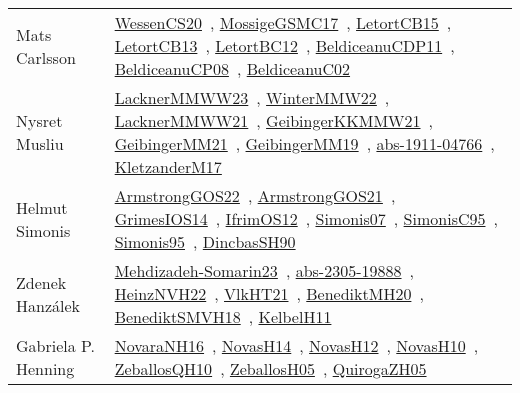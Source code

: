 {\begin{longtable}{p{4cm}p{20cm}}
Mats Carlsson & \href{papers/WessenCS20.pdf}{WessenCS20}~\cite{WessenCS20}, \href{papers/MossigeGSMC17.pdf}{MossigeGSMC17}~\cite{MossigeGSMC17}, \href{articles/LetortCB15.pdf}{LetortCB15}~\cite{LetortCB15}, \href{papers/LetortCB13.pdf}{LetortCB13}~\cite{LetortCB13}, \href{papers/LetortBC12.pdf}{LetortBC12}~\cite{LetortBC12}, \href{articles/BeldiceanuCDP11.pdf}{BeldiceanuCDP11}~\cite{BeldiceanuCDP11}, \href{papers/BeldiceanuCP08.pdf}{BeldiceanuCP08}~\cite{BeldiceanuCP08}, \href{papers/BeldiceanuC02.pdf}{BeldiceanuC02}~\cite{BeldiceanuC02}\\
Nysret Musliu & \href{articles/LacknerMMWW23.pdf}{LacknerMMWW23}~\cite{LacknerMMWW23}, \href{papers/WinterMMW22.pdf}{WinterMMW22}~\cite{WinterMMW22}, \href{papers/LacknerMMWW21.pdf}{LacknerMMWW21}~\cite{LacknerMMWW21}, \href{papers/GeibingerKKMMW21.pdf}{GeibingerKKMMW21}~\cite{GeibingerKKMMW21}, \href{papers/GeibingerMM21.pdf}{GeibingerMM21}~\cite{GeibingerMM21}, \href{papers/GeibingerMM19.pdf}{GeibingerMM19}~\cite{GeibingerMM19}, \href{articles/abs-1911-04766.pdf}{abs-1911-04766}~\cite{abs-1911-04766}, \href{papers/KletzanderM17.pdf}{KletzanderM17}~\cite{KletzanderM17}\\
Helmut Simonis & \href{papers/ArmstrongGOS22.pdf}{ArmstrongGOS22}~\cite{ArmstrongGOS22}, \href{papers/ArmstrongGOS21.pdf}{ArmstrongGOS21}~\cite{ArmstrongGOS21}, \href{articles/GrimesIOS14.pdf}{GrimesIOS14}~\cite{GrimesIOS14}, \href{papers/IfrimOS12.pdf}{IfrimOS12}~\cite{IfrimOS12}, \href{articles/Simonis07.pdf}{Simonis07}~\cite{Simonis07}, \href{papers/SimonisC95.pdf}{SimonisC95}~\cite{SimonisC95}, \href{papers/Simonis95.pdf}{Simonis95}~\cite{Simonis95}, \href{articles/DincbasSH90.pdf}{DincbasSH90}~\cite{DincbasSH90}\\
Zdenek Hanz{\'{a}}lek & \href{papers/Mehdizadeh-Somarin23.pdf}{Mehdizadeh-Somarin23}~\cite{Mehdizadeh-Somarin23}, \href{articles/abs-2305-19888.pdf}{abs-2305-19888}~\cite{abs-2305-19888}, \href{articles/HeinzNVH22.pdf}{HeinzNVH22}~\cite{HeinzNVH22}, \href{articles/VlkHT21.pdf}{VlkHT21}~\cite{VlkHT21}, \href{articles/BenediktMH20.pdf}{BenediktMH20}~\cite{BenediktMH20}, \href{papers/BenediktSMVH18.pdf}{BenediktSMVH18}~\cite{BenediktSMVH18}, \href{articles/KelbelH11.pdf}{KelbelH11}~\cite{KelbelH11}\\
Gabriela P. Henning & \href{articles/NovaraNH16.pdf}{NovaraNH16}~\cite{NovaraNH16}, \href{articles/NovasH14.pdf}{NovasH14}~\cite{NovasH14}, \href{articles/NovasH12.pdf}{NovasH12}~\cite{NovasH12}, \href{articles/NovasH10.pdf}{NovasH10}~\cite{NovasH10}, \href{articles/ZeballosQH10.pdf}{ZeballosQH10}~\cite{ZeballosQH10}, \href{articles/ZeballosH05.pdf}{ZeballosH05}~\cite{ZeballosH05}, \href{papers/QuirogaZH05.pdf}{QuirogaZH05}~\cite{QuirogaZH05}\\

\end{longtable}}
